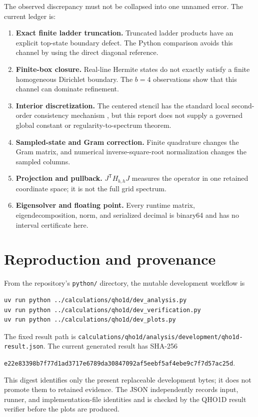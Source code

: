 \documentclass[11pt]{article}
\newcommand{\code}[1]{\texttt{#1}}
\begin{document}
The observed discrepancy must not be collapsed into one unnamed error.  The current
ledger is:
\begin{enumerate}
\item \textbf{Exact finite ladder truncation.} Truncated ladder products have an
explicit top-state boundary defect.  The Python comparison avoids this channel by
using the direct diagonal reference.
\item \textbf{Finite-box closure.} Real-line Hermite states do not exactly satisfy a
finite homogeneous Dirichlet boundary.  The $b=4$ observations show that this channel
can dominate refinement.
\item \textbf{Interior discretization.} The centered stencil has the standard local
second-order consistency mechanism \cite{strikwerda2004}, but this report does not
supply a governed global
constant or regularity-to-spectrum theorem.
\item \textbf{Sampled-state and Gram correction.} Finite quadrature changes the Gram
matrix, and numerical inverse-square-root normalization changes the sampled columns.
\item \textbf{Projection and pullback.} $J^{\mathsf T}H_{b,h}J$ measures the operator
in one retained coordinate space; it is not the full grid spectrum.
\item \textbf{Eigensolver and floating point.} Every runtime matrix, eigendecomposition,
norm, and serialized decimal is binary64 and has no interval certificate here.
\end{enumerate}

\section{Reproduction and provenance}

From the repository's \code{python/} directory, the mutable development workflow is
\begin{verbatim}
uv run python ../calculations/qho1d/dev_analysis.py
uv run python ../calculations/qho1d/dev_verification.py
uv run python ../calculations/qho1d/dev_plots.py
\end{verbatim}
The fixed result path is
\code{calculations/qho1d/analysis/development/qho1d-result.json}.  The current generated
result has SHA-256
\begin{center}
\small\code{e22e83398b7f77d1ad3717e6789da30847092af5eebf5af4ebe9c7f7d57ac25d}.
\end{center}
This digest identifies only the present replaceable development bytes; it does not
promote them to retained evidence.  The JSON independently records input, runner, and
implementation-file identities and is checked by the QHO1D result verifier before the
plots are produced.
\end{document}
